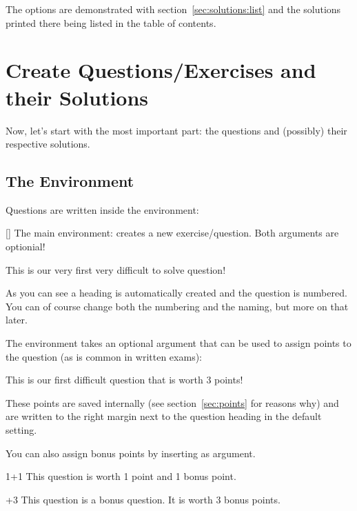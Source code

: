 \documentclass[load-preamble+,scrartcl={DIV10}]{cnltx-doc}
\begin{document}
The  options are demonstrated with section~\ref{sec:solutions:list}
and the solutions printed there being listed in the table of contents.


\section{Create Questions/Exercises and their Solutions}
Now, let's start with the most important part: the questions and (possibly)
their respective solutions.
\subsection{The  Environment}\label{ssec:questions}
Questions are written inside the  environment:
\begin{environments}
  []
    The main environment: creates a new exercise/question.  Both arguments are
    optionial!
\end{environments}
\begin{example}
  \begin{question}
    This is our very first very difficult to solve question!
  \end{question}
\end{example}
As you can see a heading is automatically created and the question is
numbered.  You can of course change both the numbering and the naming, but
more on that later.

The  environment takes an optional argument  that
can be used to assign points to the question (as is common in written exams):
\begin{example}
  \begin{question}{3}
    This is our first difficult question that is worth 3 points!
  \end{question}
\end{example}
These points are saved internally (see section~\ref{sec:points} for reasons
why) and are written to the right margin next to the question heading in the
default setting.

You can also assign bonus points by inserting  as argument.
\begin{example}
  \begin{question}{1+1}
    This question is worth 1 point and 1 bonus point.
  \end{question}
  \begin{question}{+3}
    This question is a bonus question. It is worth 3 bonus points.
  \end{question}
\end{example}
\end{document}
